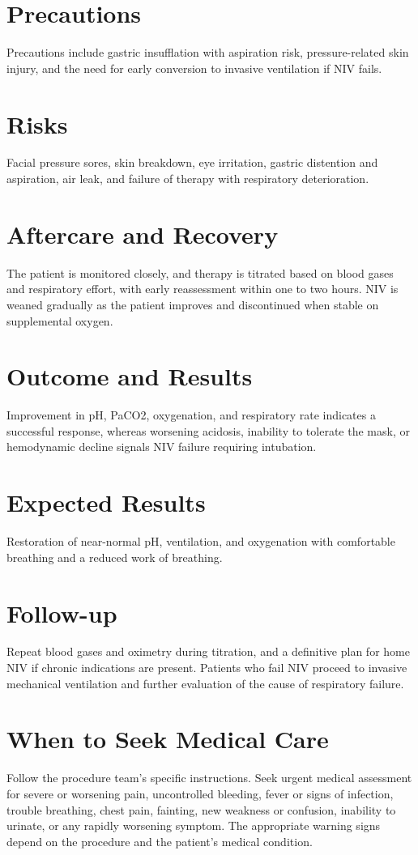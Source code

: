 \section*{Precautions}
Precautions include gastric insufflation with aspiration risk, pressure-related skin injury, and the need for early conversion to invasive ventilation if NIV fails.

\section*{Risks}
Facial pressure sores, skin breakdown, eye irritation, gastric distention and aspiration, air leak, and failure of therapy with respiratory deterioration.

\section*{Aftercare and Recovery}
The patient is monitored closely, and therapy is titrated based on blood gases and respiratory effort, with early reassessment within one to two hours. NIV is weaned gradually as the patient improves and discontinued when stable on supplemental oxygen.

\section*{Outcome and Results}
Improvement in pH, PaCO2, oxygenation, and respiratory rate indicates a successful response, whereas worsening acidosis, inability to tolerate the mask, or hemodynamic decline signals NIV failure requiring intubation.

\section*{Expected Results}
Restoration of near-normal pH, ventilation, and oxygenation with comfortable breathing and a reduced work of breathing.

\section*{Follow-up}
Repeat blood gases and oximetry during titration, and a definitive plan for home NIV if chronic indications are present. Patients who fail NIV proceed to invasive mechanical ventilation and further evaluation of the cause of respiratory failure.

\section*{When to Seek Medical Care}
Follow the procedure team's specific instructions. Seek urgent medical assessment for severe or worsening pain, uncontrolled bleeding, fever or signs of infection, trouble breathing, chest pain, fainting, new weakness or confusion, inability to urinate, or any rapidly worsening symptom. The appropriate warning signs depend on the procedure and the patient's medical condition.


